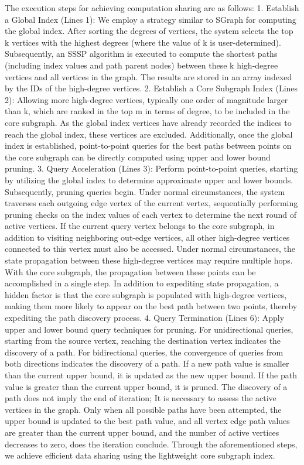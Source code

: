 \documentclass[lettersize,journal]{IEEEtran} %
\begin{document}
The execution steps for achieving computation sharing are as follows: 1. Establish a Global Index (Lines 1): We employ a strategy similar to SGraph for computing the global index. After sorting the degrees of vertices, the system selects the top k vertices with the highest degrees (where the value of k is user-determined). Subsequently, an SSSP algorithm is executed to compute the shortest paths (including index values and path parent nodes) between these k high-degree vertices and all vertices in the graph. The results are stored in an array indexed by the IDs of the high-degree vertices. 2. Establish a Core Subgraph Index (Lines 2): Allowing more high-degree vertices, typically one order of magnitude larger than k, which are ranked in the top m in terms of degree, to be included in the core subgraph. As the global index vertices have already recorded the indices to reach the global index, these vertices are excluded. Additionally, once the global index is established, point-to-point queries for the best paths between points on the core subgraph can be directly computed using upper and lower bound pruning. 3. Query Acceleration (Lines 3): Perform point-to-point queries, starting by utilizing the global index to determine approximate upper and lower bounds. Subsequently, pruning queries begin. Under normal circumstances, the system traverses each outgoing edge vertex of the current vertex, sequentially performing pruning checks on the index values of each vertex to determine the next round of active vertices. If the current query vertex belongs to the core subgraph, in addition to visiting neighboring out-edge vertices, all other high-degree vertices connected to this vertex must also be accessed. Under normal circumstances, the state propagation between these high-degree vertices may require multiple hops. With the core subgraph, the propagation between these points can be accomplished in a single step. In addition to expediting state propagation, a hidden factor is that the core subgraph is populated with high-degree vertices, making them more likely to appear on the best path between two points, thereby expediting the path discovery process. 4. Query Termination (Lines 6): Apply upper and lower bound query techniques for pruning. For unidirectional queries, starting from the source vertex, reaching the destination vertex indicates the discovery of a path. For bidirectional queries, the convergence of queries from both directions indicates the discovery of a path. If a new path value is smaller than the current upper bound, it is updated as the new upper bound. If the path value is greater than the current upper bound, it is pruned. The discovery of a path does not imply the end of iteration; It is necessary to assess the active vertices in the graph. Only when all possible paths have been attempted, the upper bound is updated to the best path value, and all vertex edge path values are greater than the current upper bound, and the number of active vertices decreases to zero, does the iteration conclude. Through the aforementioned steps, we achieve efficient data sharing using the lightweight core subgraph index.
\end{document}
